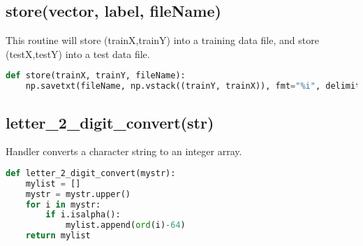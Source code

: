\documentclass[a4paper]{article}
\begin{document}
\subsection{store(vector, label, fileName)}
This routine will store (trainX,trainY) into a training data file, and store (testX,testY) into a test data file.
\begin{lstlisting}[language=Python]
def store(trainX, trainY, fileName):
    np.savetxt(fileName, np.vstack((trainY, trainX)), fmt="%i", delimiter=',')
\end{lstlisting}

\subsection{letter\_2\_digit\_convert(str)}
Handler converts a character string to an integer array.
\begin{lstlisting}[language=Python]
def letter_2_digit_convert(mystr):
    mylist = []
    mystr = mystr.upper()
    for i in mystr:
        if i.isalpha():
            mylist.append(ord(i)-64)
    return mylist
\end{lstlisting}
\end{document}
